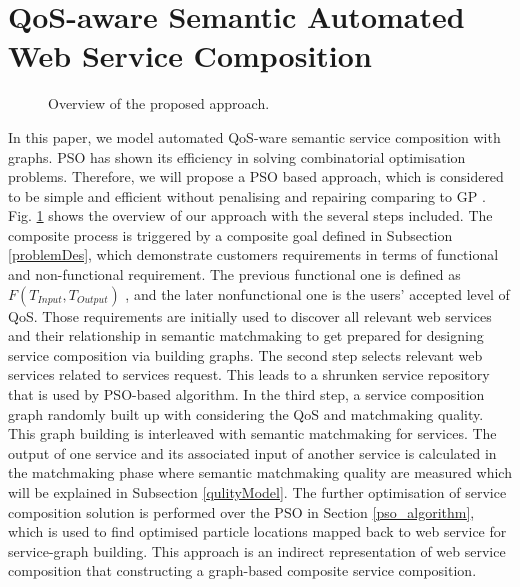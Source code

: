 \documentclass{llncs}
\begin{document}
\section{QoS-aware Semantic Automated Web Service Composition}\label{qswsc_approach}
\begin{figure}[h]
\centerline{
}
 \caption{Overview of the proposed approach.}
 \label{overview}
\end{figure}
In this paper, we model automated QoS-ware semantic service composition with graphs. PSO has shown its efficiency in solving combinatorial optimisation problems. Therefore, we will propose a PSO based approach, which is considered to be simple and efficient without penalising and repairing comparing to GP \cite{da2014graph}. Fig. \ref{overview} shows the overview of our approach with the several steps included. The composite process is triggered by a composite goal defined in Subsection \ref{problemDes}, which demonstrate customers requirements in terms of functional and non-functional requirement. The previous functional one is defined as $F(T_{Input}, T_{Output})$ , and the later nonfunctional one is the users' accepted level of QoS. Those requirements are initially used to discover all relevant web services and their relationship in semantic matchmaking to get prepared for designing service composition via building graphs. The second step selects relevant web services related to services request. This leads to a shrunken service repository that is used by PSO-based algorithm. In the third step, a service composition graph randomly built up with considering the QoS and matchmaking quality. This graph building is interleaved with semantic matchmaking for services. The output of one service and its associated input of another service is calculated in the matchmaking phase where semantic matchmaking quality are measured which will be explained in Subsection \ref{qulityModel}. The further optimisation of service composition solution is performed over the PSO in Section \ref{pso_algorithm}, which is used to find optimised particle locations mapped back to web service for service-graph building. This approach \cite{da2016particle} is an indirect representation of web service composition that constructing a graph-based composite service composition.
\end{document}
